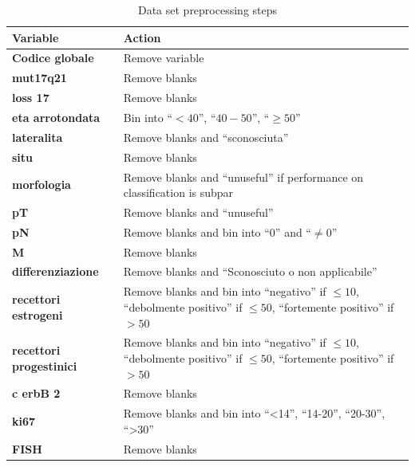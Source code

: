 \begin{table}[htbp]
\caption{Data set preprocessing steps}
\begin{tabularx}{\textwidth}{@{} l Y @{}}
\toprule 
\textbf{Variable} & Action \\
\midrule 
\textbf{Codice globale} & Remove variable \\
\textbf{mut17q21} & Remove blanks \\
\textbf{loss 17} & Remove blanks \\
\textbf{eta arrotondata} & Bin into \enquote{$< 40$}, \enquote{$40-50$}, \enquote{$\geq 50$} \\
\textbf{lateralita} & Remove blanks and \enquote{sconosciuta} \\
\textbf{situ} & Remove blanks \\ \addlinespace
\textbf{morfologia} & Remove blanks and \enquote{unuseful} if performance on classification is subpar \\ \addlinespace
\textbf{pT} & Remove blanks and \enquote{unuseful}  \\
\textbf{pN} & Remove blanks and bin into \enquote{0} and \enquote{$\neq0$}\\
\textbf{M} & Remove blanks \\ 
\textbf{differenziazione} & Remove blanks and \enquote{Sconosciuto o non applicabile} \\ \addlinespace
\textbf{recettori estrogeni} & Remove blanks and bin into \enquote{negativo} if $\leq 10$,
		\enquote{debolmente positivo} if $\leq 50$, 
		\enquote{fortemente positivo} if $> 50$ \\ \addlinespace
\textbf{recettori progestinici} & Remove blanks and bin into \enquote{negativo} if $\leq 10$, 
		\enquote{debolmente positivo} if $\leq 50$, 
		\enquote{fortemente positivo} if $> 50$ \\ \addlinespace
\textbf{c erbB 2} & Remove blanks \\ 
\textbf{ki67} & Remove blanks and bin into \enquote{<14}, 
		\enquote{14-20}, \enquote{20-30}, \enquote{>30} \\ 
\textbf{FISH} & Remove blanks \\
\bottomrule
\end{tabularx}
\label{tab:datasetpreprocess}
\end{table}


